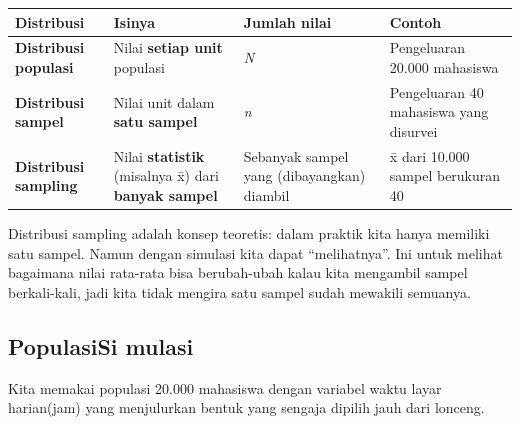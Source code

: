 \documentclass[
  indonesian,
  letterpaper,
]{book}
\newcounter{none} %
\begin{document}
{\def\LTcaptype{none} %
\begin{longtable}[]{@{}
  >{\raggedright\arraybackslash}p{}
  >{\raggedright\arraybackslash}p{}
  >{\raggedright\arraybackslash}p{}
  >{\raggedright\arraybackslash}p{}@{}}
\toprule\noalign{}
\begin{minipage}[b]{\linewidth}\raggedright
Distribusi
\end{minipage} & \begin{minipage}[b]{\linewidth}\raggedright
Isinya
\end{minipage} & \begin{minipage}[b]{\linewidth}\raggedright
Jumlah nilai
\end{minipage} & \begin{minipage}[b]{\linewidth}\raggedright
Contoh
\end{minipage} \\
\midrule\noalign{}
\endhead
\bottomrule\noalign{}
\endlastfoot
\textbf{Distribusi populasi} & Nilai \textbf{setiap unit} populasi &
\emph{N} & Pengeluaran 20.000 mahasiswa \\
\textbf{Distribusi sampel} & Nilai unit dalam \textbf{satu sampel} &
\emph{n} & Pengeluaran 40 mahasiswa yang disurvei \\
\textbf{Distribusi sampling} & Nilai \textbf{statistik} (misalnya x̄)
dari \textbf{banyak sampel} & Sebanyak sampel yang (dibayangkan) diambil
& x̄ dari 10.000 sampel berukuran 40 \\
\end{longtable}
}

Distribusi sampling adalah konsep teoretis: dalam praktik kita hanya
memiliki satu sampel. Namun dengan simulasi kita dapat ``melihatnya''.
Ini untuk melihat bagaimana nilai rata-rata bisa berubah-ubah kalau kita
mengambil sampel berkali-kali, jadi kita tidak mengira satu sampel sudah
mewakili semuanya.

\subsection{PopulasiSi mulasi}\label{populasisi-mulasi}

Kita memakai populasi 20.000 mahasiswa dengan variabel waktu layar
harian(jam) yang menjulurkan bentuk yang sengaja dipilih jauh dari
lonceng.
\end{document}
